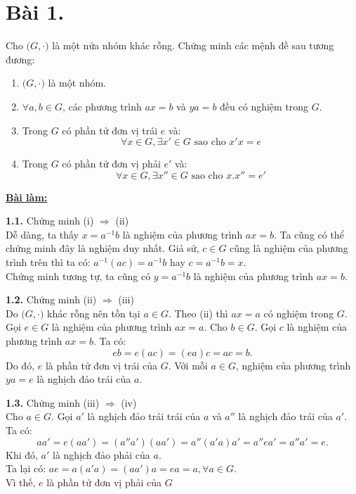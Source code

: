 \section*{Bài 1.}

Cho $\big( G, \cdot \big)$ là một nửa nhóm khác rỗng. Chứng minh các mệnh đề sau tương đương:
\begin{enumerate}[label=(\roman*)]
    \item $\big( G, \cdot \big)$ là một nhóm.
    \item $\forall a, b \in G$, các phương trình $ax = b$ và $ya = b$ đều có nghiệm trong $G$.
    \item Trong $G$ có phần tử đơn vị trái $e$ và:
    $$\forall x \in G, \exists x' \in G \text{ sao cho } x'x = e$$
    \item Trong $G$ có phần tử đơn vị phải $e'$ và:
    $$\forall x \in G, \exists x'' \in G \text{ sao cho } x.x'' = e'$$
\end{enumerate}
	

\centering
\textbf{\underline{Bài làm:}}

\justifying
\textbf{1.1.} Chứng minh (i) $\Rightarrow$ (ii)\\
Dễ dàng, ta thấy $x = a^{-1}b$ là nghiệm của phương trình $ax = b$. Ta cũng có thể chứng minh đây là nghiệm duy nhất. Giả sử, $c \in G$ cũng là nghiệm của phương trình trên thì ta có: $a^{-1}(ac) = a^{-1}b$ hay $c = a^{-1}b = x$.\\
Chứng minh tương tự, ta cũng có $y = a^{-1}b$ là nghiệm của phương trình $ax = b$.

\textbf{1.2.} Chứng minh (ii) $\Rightarrow$ (iii)\\
Do $\big( G, \cdot \big)$ khác rỗng nên tồn tại $a \in G$. Theo (ii) thì $ax = a$ có nghiệm trong $G$. Gọi $e \in G$ là nghiệm của phương trình $ax = a$. Cho $b \in G$. Gọi $c$ là nghiệm của phương trình $ax = b$. Ta có:
$$eb = e(ac) = (ea)c = ac = b.$$
Do đó, $e$ là phần tử đơn vị trái của $G$. Với mỗi $a \in G$, nghiệm của phương trình $ya = e$ là nghịch đảo trái của $a$.

\textbf{1.3.} Chứng minh (iii) $\Rightarrow$ (iv)\\
Cho $a \in G$. Gọi $a'$ là nghịch đảo trái trái của $a$ và $a''$ là nghịch đảo trái của $a'$. Ta có:
$$aa' = e(aa') = (a''a')(aa') = a''(a'a)a' = a''ea' = a''a' = e.$$
Khi đó, $a'$ là nghịch đảo phải của $a$.\\
Ta lại có: $ae = a(a'a) = (aa')a = ea = a, \forall a \in G$.\\
Vì thế, $e$ là phần tử đơn vị phải của $G$

